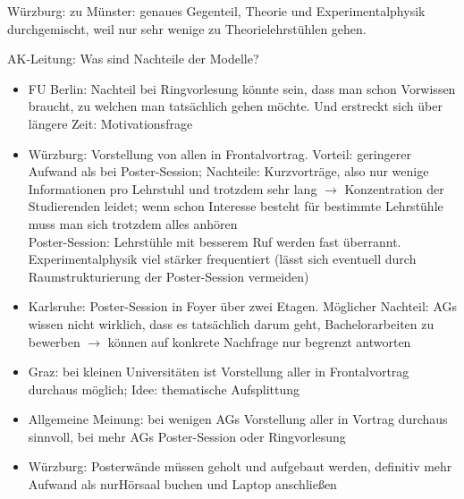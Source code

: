     Würzburg: zu Münster: genaues Gegenteil, Theorie und Experimentalphysik durchgemischt, weil nur sehr wenige zu Theorielehrstühlen gehen.

    AK-Leitung: Was sind Nachteile der Modelle?
    \begin{itemize}
      \item FU Berlin: Nachteil bei Ringvorlesung könnte sein, dass man schon Vorwissen braucht, zu welchen man tatsächlich gehen möchte. Und erstreckt sich über längere Zeit: Motivationsfrage
      \item Würzburg: Vorstellung von allen in Frontalvortrag. Vorteil: geringerer Aufwand als bei Poster-Session; Nachteile: Kurzvorträge, also nur wenige Informationen pro Lehrstuhl und trotzdem sehr lang $\rightarrow$ Konzentration der Studierenden leidet; wenn schon Interesse besteht für bestimmte Lehrstühle muss man sich trotzdem alles anhören \\
      Poster-Session: Lehrstühle mit besserem Ruf werden fast überrannt. Experimentalphysik viel stärker frequentiert (lässt sich eventuell durch Raumstrukturierung der Poster-Session vermeiden)
      \item Karlsruhe: Poster-Session in Foyer über zwei Etagen. Möglicher Nachteil: AGs wissen nicht wirklich, dass es tatsächlich darum geht, Bachelorarbeiten zu bewerben $\rightarrow$ können auf konkrete Nachfrage nur begrenzt antworten
      \item Graz: bei kleinen Universitäten ist Vorstellung aller in Frontalvortrag durchaus möglich; Idee: thematische Aufsplittung
      \item Allgemeine Meinung: bei wenigen AGs Vorstellung aller in Vortrag durchaus sinnvoll, bei mehr AGs Poster-Session oder Ringvorlesung
      \item Würzburg: Posterwände müssen geholt und aufgebaut werden, definitiv mehr Aufwand als \flqq nur\frqq Hörsaal buchen und Laptop anschließen

    \end{itemize}

